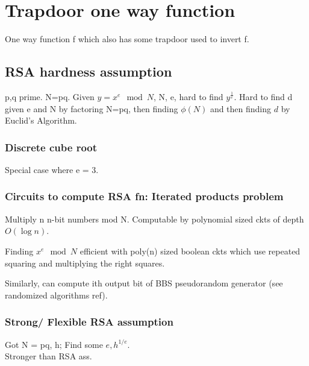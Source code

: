 \documentclass[oneside, article]{memoir}
\begin{document}
\section{Trapdoor one way function}
One way function f which also has some trapdoor used to invert f.

\subsection{RSA hardness assumption}
p,q prime. N=pq. Given $y = x^{e} \mod N$, N, e, hard to find $y^{\frac{1}{e}}$. Hard to find d given e and N by factoring N=pq, then finding $\phi(N)$ and then finding $d$ by Euclid's Algorithm.

\subsubsection{Discrete cube root}
Special case where e = 3.

\subsubsection{Circuits to compute RSA fn: Iterated products problem}
Multiply n n-bit numbers mod N. Computable by polynomial sized ckts of depth $O(\log n)$.

Finding $x^{e} \mod N$ efficient with poly(n) sized boolean ckts which use repeated squaring and multiplying the right squares.

Similarly, can compute ith output bit of BBS pseudorandom generator (see randomized algorithms ref).

\subsubsection{Strong/ Flexible RSA assumption}
Got N = pq, h; Find some $e, h^{1/e}$. \\
Stronger than RSA ass.





\end{document}
